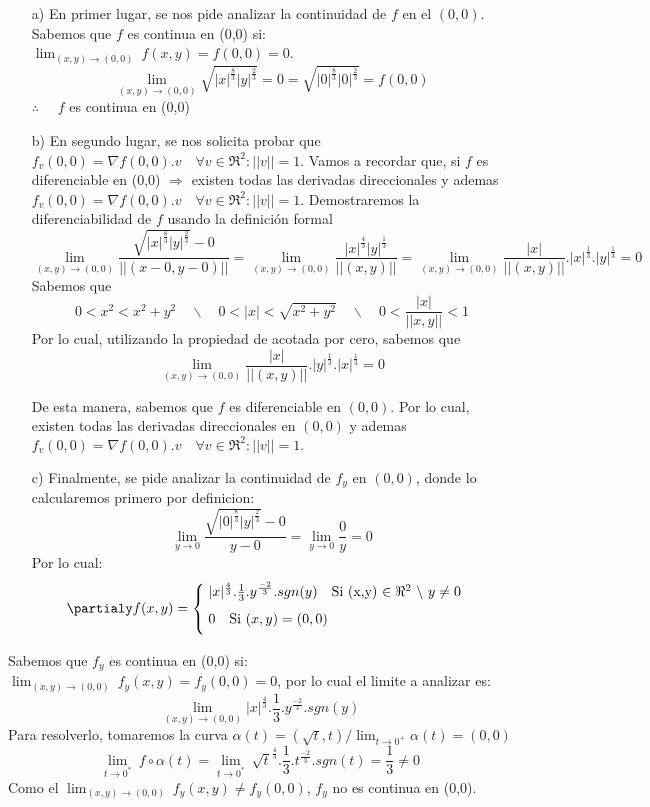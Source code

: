 \begin{solution}
\begin{itemize}
   \item[a)] En primer lugar, se nos pide analizar la continuidad de $f$ en el $(0,0)$. 
Sabemos que $f$ es continua en (0,0) si:  $\lim_{(x,y)\to(0,0)} \ f(x,y) = f(0,0)=0$. 
\[
        \lim_{(x,y)\to (0,0)} \sqrt{|x|^{\frac{8}{3}}|y|^{\frac{2}{3}}}=0=\sqrt{|0|^{\frac{8}{3}}|0|^{\frac{2}{3}}}=f(0,0)
    \]
 $\therefore\quad$ $f$ es continua en (0,0)

     \item[b)] En segundo lugar, se nos solicita probar que $f_v(0,0)=\nabla f(0,0).v \quad \forall v \in \Re^2: ||v||=1.$ 
Vamos a recordar que, si $f$ es diferenciable en (0,0) $\Rightarrow $ existen todas las derivadas direccionales y ademas $f_v(0,0)=\nabla f(0,0).v \quad \forall v \in \Re^2: ||v||=1.$ Demostraremos la diferenciabilidad de $f$ usando la definición formal 
\[
        \lim_{(x,y)\to (0,0)} \frac{\sqrt{|x|^{\frac{8}{3}}|y|^{\frac{2}{3}}}-0}{||(x-0,y-0)||}= \lim_{(x,y)\to (0,0)} \frac{|x|^{\frac{4}{3}}|y|^{\frac{1}{3}}}{||(x,y)||}= \lim_{(x,y)\to (0,0)} \frac{|x|}{||(x,y)||}.|x|^{\frac{1}{3}}.|y|^{\frac{1}{3}}=0
    \]
Sabemos que
\[
        0<x^2<x^2+y^2 \quad\backslash\quad  0<|x|<\sqrt{x^2+y^2} \quad\backslash\quad  0<\frac{|x|}{||x,y||}<1
    \]
Por lo cual, utilizando la propiedad de acotada por cero, sabemos que
\[
        \lim_{(x,y)\to (0,0)} \frac{|x|}{||(x,y)||}.|y|^{\frac{1}{3}}.|x|^{\frac{1}{3}}=0
    \]

De esta manera, sabemos que $f$ es diferenciable en $(0,0)$. Por lo cual, existen todas las derivadas direccionales en $(0,0)$ y ademas $f_v(0,0)=\nabla f(0,0).v \quad \forall v \in \Re^2: ||v||=1.$ 
      \item[c)] Finalmente, se pide analizar la continuidad de $f_y $ en $(0,0)$, donde lo calcularemos primero por definicion:
\[
         \lim_{y\to0} \frac{\sqrt{|0|^{\frac{8}{3}}|y|^{\frac{2}{3}}}-0}{y-0}=\lim_{y\to0} \frac{0}{y}=0
    \]
    Por lo cual:
    \[
     \partialy f(x,y)= \begin{cases}
            \;|x|^\frac{4}{3} .\frac{1}{3}.y^\frac{-2}{3}.sgn(y) \quad \text{Si (x,y) $\in \Re^2$ $\backslash$ $y\neq0$} \\[5pt]
            \;0\quad \text{Si $(x,y)=(0,0)$}\\[5pt] 
        \end{cases}
    \]
\end{itemize}
Sabemos que $f_y$ es continua en (0,0) si:  $\lim_{(x,y)\to(0,0)} \ f_y(x,y) = f_y(0,0)=0$, por lo cual el limite a analizar es: 
\[
        \lim_{(x,y)\to (0,0)} |x|^\frac{4}{3} .\frac{1}{3}.y^\frac{-2}{3}.sgn(y)
    \]
Para resolverlo, tomaremos la curva $\alpha(t)=(\sqrt{t},t) / \lim_{t\to0^+} \alpha(t) = (0,0)$
    \[
         \lim_{t\to0^*} \
          f\circ\alpha(t)=\lim_{t\to0^*} \
         \sqrt{t}^\frac{4}{3} .\frac{1}{3}.t^\frac{-2}{3}.sgn(t)=\frac{1}{3}\neq0
    \]
    Como el $\lim_{(x,y)\to(0,0)} \ f_y(x,y) \neq f_y(0,0)$, $f_y$ no es continua en (0,0).
\end{solution}
